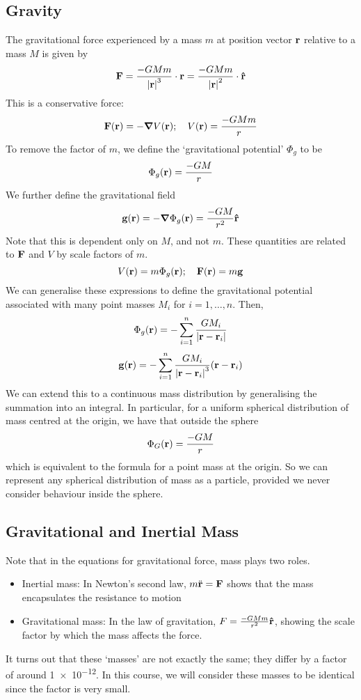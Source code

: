 \documentclass{article}
\begin{document}
\subsection{Gravity}
The gravitational force experienced by a mass $m$ at position vector $\vb r$ relative to a mass $M$ is given by
\[ \vb F = \frac{- G M m}{\abs{\vb r}^3} \cdot \vb r = \frac{- G M m}{\abs{\vb r}^2} \cdot \vu{r} \]
This is a conservative force:
\[ \vb F(\vb r) = -\grad V(\vb r);\quad V(\vb r) = \frac{-GMm}{r} \]
To remove the factor of $m$, we define the `gravitational potential' $\Phi_g$ to be
\[ \Phi_g(\vb r) = \frac{-GM}{r} \]
We further define the gravitational field
\[ \vb g(\vb r) = -\grad \Phi_g(\vb r) = \frac{-GM}{r^2}\vu{r} \]
Note that this is dependent only on $M$, and not $m$. These quantities are related to $\vb F$ and $V$ by scale factors of $m$.
\[ V(\vb r) = m \Phi_g(\vb r);\quad \vb F(\vb r) = m\vb g \]
We can generalise these expressions to define the gravitational potential associated with many point masses $M_i$ for $i = 1, \dots, n$. Then,
\[ \Phi_g(\vb r) = -\sum_{i=1}^n \frac{GM_i}{\abs{\vb r - \vb r_i}} \]
\[ \vb g(\vb r) = -\sum_{i=1}^n \frac{GM_i}{\abs{\vb r - \vb r_i}^3}(\vb r - \vb r_i) \]
We can extend this to a continuous mass distribution by generalising the summation into an integral. In particular, for a uniform spherical distribution of mass centred at the origin, we have that outside the sphere
\[ \Phi_G(\vb r) = \frac{-GM}{r} \]
which is equivalent to the formula for a point mass at the origin. So we can represent any spherical distribution of mass as a particle, provided we never consider behaviour inside the sphere.

\subsection{Gravitational and Inertial Mass}
Note that in the equations for gravitational force, mass plays two roles.
\begin{itemize}
	\item Inertial mass: In Newton's second law, $m \ddot{\vb r} = \vb F$ shows that the mass encapsulates the resistance to motion
	\item Gravitational mass: In the law of gravitation, $F = \frac{-GMm}{r^2}\vu{r}$, showing the scale factor by which the mass affects the force.
\end{itemize}
It turns out that these `masses' are not exactly the same; they differ by a factor of around \num{1e-12}. In this course, we will consider these masses to be identical since the factor is very small.
\end{document}
